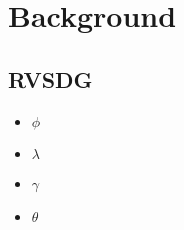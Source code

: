 
\section{Background}

\subsection{RVSDG}

\begin{itemize}

	\item \textit{$\phi$}

	\item \textit{$\lambda$}

	\item \textit{$\gamma$}

	\item \textit{$\theta$}

\end{itemize}
